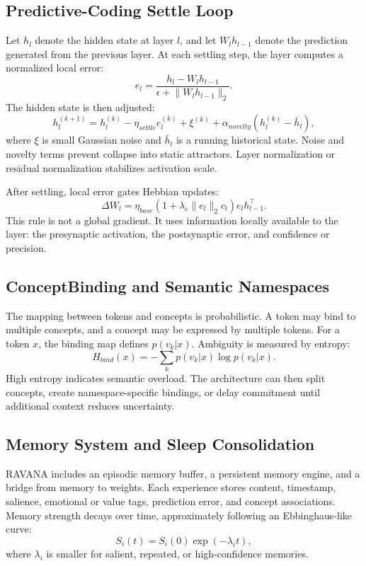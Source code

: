 \documentclass[11pt]{article}
\begin{document}
\subsection{Predictive-Coding Settle Loop}
Let $h_l$ denote the hidden state at layer $l$, and let $W_l h_{l-1}$ denote the prediction generated from the previous layer. At each settling step, the layer computes a normalized local error:
\begin{equation}
 e_l = \frac{h_l - W_l h_{l-1}}{\epsilon + \lVert W_l h_{l-1}\rVert_2}.
\end{equation}
The hidden state is then adjusted:
\begin{equation}
 h_l^{(k+1)} = h_l^{(k)} - \eta_{settle}e_l^{(k)} + \xi^{(k)} + \alpha_{novelty}(h_l^{(k)}-\bar{h}_l),
\end{equation}
where $\xi$ is small Gaussian noise and $\bar{h}_l$ is a running historical state. Noise and novelty terms prevent collapse into static attractors. Layer normalization or residual normalization stabilizes activation scale.

After settling, local error gates Hebbian updates:
\begin{equation}
 \Delta W_l = \eta_{base}\left(1 + \lambda_e\lVert e_l\rVert_2 c_l\right)e_l h_{l-1}^{\top}.
\end{equation}
This rule is not a global gradient. It uses information locally available to the layer: the presynaptic activation, the postsynaptic error, and confidence or precision.

\subsection{ConceptBinding and Semantic Namespaces}
The mapping between tokens and concepts is probabilistic. A token may bind to multiple concepts, and a concept may be expressed by multiple tokens. For a token $x$, the binding map defines $p(v_k|x)$. Ambiguity is measured by entropy:
\begin{equation}
 H_{bind}(x)=-\sum_k p(v_k|x)\log p(v_k|x).
\end{equation}
High entropy indicates semantic overload. The architecture can then split concepts, create namespace-specific bindings, or delay commitment until additional context reduces uncertainty.

\subsection{Memory System and Sleep Consolidation}
RAVANA includes an episodic memory buffer, a persistent memory engine, and a bridge from memory to weights. Each experience stores content, timestamp, salience, emotional or value tags, prediction error, and concept associations. Memory strength decays over time, approximately following an Ebbinghaus-like curve:
\begin{equation}
 S_i(t)=S_i(0)\exp(-\lambda_i t),
\end{equation}
where $\lambda_i$ is smaller for salient, repeated, or high-confidence memories.
\end{document}
